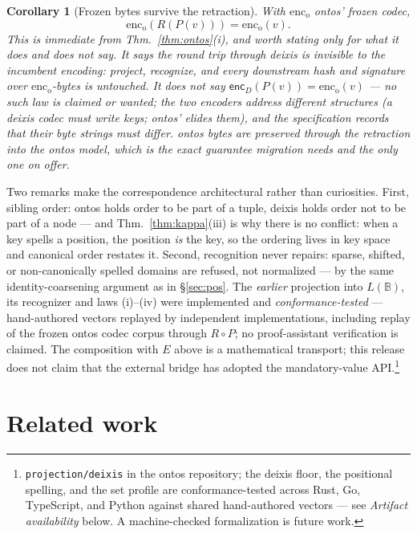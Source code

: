 \documentclass[11pt]{article}
\newtheorem{corollary}[theorem]{Corollary}
\theoremstyle{definition}
\newcommand{\Bytes}{\mathbb{B}}                    %
\newcommand{\encD}{\mathsf{enc}_{\!D}}
\begin{document}
\begin{corollary}[Frozen bytes survive the retraction]
With $\mathrm{enc_o}$ ontos' frozen codec,
\[
\mathrm{enc_o}(R(P(v))) = \mathrm{enc_o}(v).
\]
This is immediate from
Thm.~\ref{thm:ontos}(i), and worth stating only for what it does \emph{and does not}
say. It says the round trip through deixis is invisible to the incumbent encoding:
project, recognize, and every downstream hash and signature over
$\mathrm{enc_o}$-bytes is untouched. It does \emph{not} say
$\encD(P(v)) = \mathrm{enc_o}(v)$ --- no such law is claimed or wanted; the two
encoders address different structures (a deixis codec must write keys; ontos'
elides them), and the specification records that their byte strings must differ.
ontos bytes are preserved \emph{through the retraction into the ontos model}, which is
the exact guarantee migration needs and the only one on offer.
\end{corollary}

Two remarks make the correspondence architectural rather than curiosities. First,
sibling order: ontos holds order to be part of a tuple, deixis holds order not to be
part of a node --- and Thm.~\ref{thm:kappa}(iii) is why there is no conflict: when a
key spells a position, the position \emph{is} the key, so the ordering lives in key
space and canonical order restates it. Second, recognition never repairs: sparse,
shifted, or non-canonically spelled domains are refused, not normalized ---
by the same identity-coarsening argument as in \S\ref{sec:pos}. The \emph{earlier}
projection into $L(\Bytes)$, its recognizer and laws (i)--(iv) were implemented and \emph{conformance-tested} ---
hand-authored vectors replayed by independent implementations, including replay of
the frozen ontos codec corpus through $R \circ P$; no proof-assistant verification is
claimed. The composition with $E$ above is a mathematical transport; this release
does not claim that the external bridge has adopted the mandatory-value API.\footnote{\texttt{projection/deixis} in the ontos repository; the deixis
floor, the positional spelling, and the set profile are conformance-tested across
Rust, Go, TypeScript, and Python against shared hand-authored vectors --- see
\emph{Artifact availability} below. A machine-checked formalization is future work.}

\section{Related work}\label{sec:related}
\end{document}
